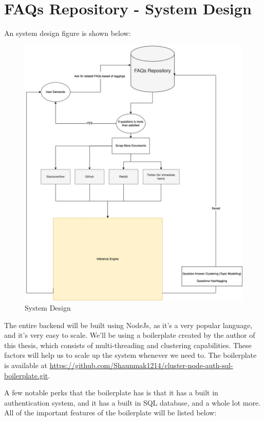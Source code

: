 \section{FAQs Repository - System Design}
An system design figure is shown below:

\pagebreak
\begin{figure}[H]
  \centering
  \noindent \includegraphics[scale=0.50]{assets/faq_repo_workflow.png}
\caption{System Design}\label{system_design}
\end{figure}

The entire backend will be built using NodeJs, as it's a very popular language, and it's very easy to scale. We'll be using a boilerplate created by the author of this thesis, which consists of multi-threading and clustering capabilities. These factors will help us to scale up the system whenever we need to. The boilerplate is available at \url{https://github.com/Shaunmak1214/cluster-node-auth-sql-boilerplate.git}. 

A few notable perks that the boilerplate has is that it has a built in authentication system, and it has a built in SQL database, and a whole lot more. All of the important features of the boilerplate will be listed below:


